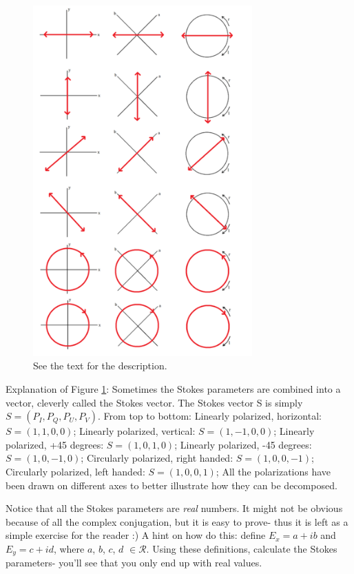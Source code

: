 \documentclass{article}
\begin{document}
\begin{figure}
    \centering
    \includegraphics[width=0.75\textwidth]{375px-Stokes1.png}
    \caption{See the text for the description.}
    \label{fig:stokes}
\end{figure}

Explanation of Figure \ref{fig:stokes}: Sometimes the Stokes parameters are combined into a vector, cleverly called the Stokes vector. The Stokes vector S is simply $S = (P_I, P_Q, P_U, P_V)$. From top to bottom: Linearly polarized, horizontal: $S = (1,1,0,0)$; Linearly polarized, vertical: $S = (1,-1,0,0)$; Linearly polarized, +45 degrees: $S = (1,0,1,0)$; Linearly polarized, -45 degrees: $S = (1,0,-1,0)$; Circularly polarized, right handed: $S = (1,0,0,-1)$; Circularly polarized, left handed: $S = (1,0,0,1)$; All the polarizations have been drawn on different axes to better illustrate how they can be decomposed.

Notice that all the Stokes parameters are \emph{real} numbers. It might not be obvious because of all the complex conjugation, but it is easy to prove- thus it is left as a simple exercise for the reader :) A hint on how do this: define $E_x = a + ib$ and $E_y = c + id$, where $a$, $b$, $c$, $d$ $\in \mathcal{R}$. Using these definitions, calculate the Stokes parameters- you'll see that you only end up with real values.
\end{document}
